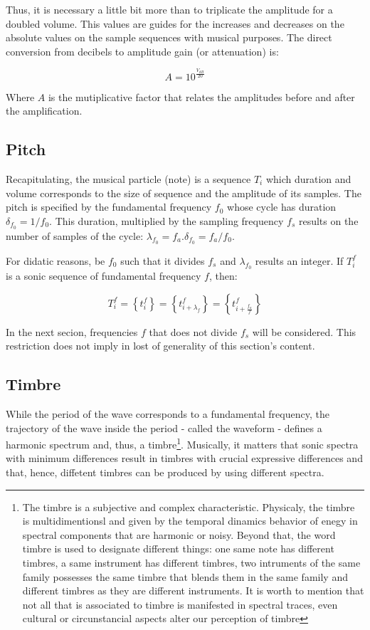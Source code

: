 \documentclass[
 aip,
 jmp,
 amsmath,amssymb,
 reprint,
]{revtex4-1}
\begin{document}
Thus, it is necessary a little bit more than to triplicate the amplitude for a doubled volume. This values are guides for the increases and decreases on the absolute values on the sample sequences with musical purposes. The direct conversion from decibels to amplitude gain (or attenuation) is:

\begin{equation}\label{ampDec}
A = 10^{\frac{V_{dB}}{20}}
\end{equation}

Where $A$ is the mutiplicative factor that relates the amplitudes before and after the amplification.

\subsection{Pitch}
Recapitulating, the musical particle (note) is a sequence $T_i$ which duration and volume corresponds to the size of sequence and the amplitude of its samples. The pitch is specified by the fundamental frequency $f_0$ whose cycle has duration $\delta_{f_0}=1/f_0$. This duration, multiplied by the sampling frequency $f_s$ results on the number of samples of the cycle: $\lambda_{f_0}=f_a . \delta_{f_0} =f_a/f_0$.

For didatic reasons, be $f_0$ such that it divides $f_s$ and $\lambda_{f_0}$ results an integer. If $T_i^f$ is a sonic sequence of fundamental frequency $f$, then:

\begin{equation}\label{periodicidade}
     T^f_i=\left\{ t_i^f \right\}=\left\{ t^f_{i+\lambda_{f}}  \right\}= \left\{ t^f_{i+\frac{f_a}{f}} \right\}
\end{equation}

In the next secion, frequencies $f$ that does not divide $f_s$ will be considered. This restriction does not imply in lost of generality of this section's content.

\subsection{Timbre}
While the period of the wave corresponds to a fundamental frequency, the trajectory of the wave inside the period - called the waveform - defines a harmonic spectrum and, thus, a timbre\footnote{The timbre is a subjective and complex characteristic. Physicaly, the timbre is multidimentionsl and given by the temporal dinamics behavior of enegy in spectral components that are harmonic or noisy. Beyond that, the word timbre is used to designate different things: one same note has different timbres, a same instrument has different timbres, two intruments of the same family possesses the same timbre that blends them in the same family and different timbres as they are different instruments. It is worth to mention that not all that is associated to timbre is manifested in spectral traces, even cultural or circunstancial aspects alter our perception of timbre}. Musically, it matters that sonic spectra with minimum differences result in timbres with crucial expressive differences and that, hence, diffetent timbres can be produced by using different spectra\cite{Roederer}.
\end{document}
